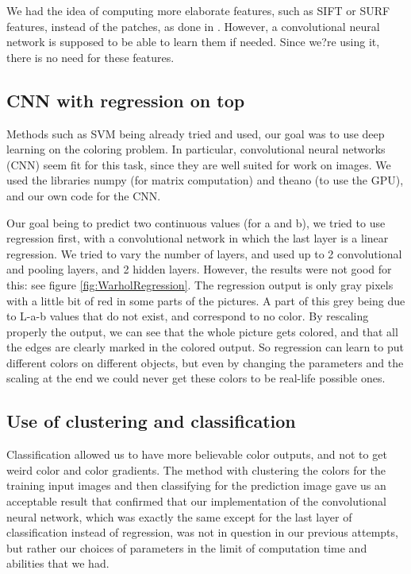 \documentclass[10pt,twocolumn]{article}
\begin{document}
We had the idea of computing more elaborate features, such as SIFT or SURF features, instead of the patches, as done in \cite{bestPaper}. However, a convolutional neural network is supposed to be able to learn them if needed. Since we?re using it, there is no need for these features.

\subsection{CNN with regression on top}
Methods such as SVM being already tried and used, our goal was to use deep learning on the coloring problem. In particular, convolutional neural networks (CNN) seem fit for this task, since they are well suited for work on images. We used the libraries numpy \cite{numpy} (for matrix computation) and theano \cite{theano} (to use the GPU), and our own code for the CNN. 

Our goal being to predict two continuous values (for a and b), we tried to use regression first, with a convolutional network in which the last layer is a linear regression. We tried to vary the number of layers, and used up to 2 convolutional and pooling layers, and 2 hidden layers. However, the results were not good for this: see figure \ref{fig:WarholRegression}. The regression output is only gray pixels with a little bit of red in some parts of the pictures. A part of this grey being due to L-a-b values that do not exist, and correspond to no color. By rescaling properly the output, we can see that the whole picture gets colored, and that all the edges are clearly marked in the colored output. So regression can learn to put different colors on different objects, but even by changing the parameters and the scaling at the end we could never get these colors to be real-life possible ones.


\subsection{Use of clustering and classification}
Classification allowed us to have more believable color outputs, and not to get weird color and color gradients. The method with clustering the colors for the training input images and then classifying for the prediction image gave us an acceptable result that confirmed that our implementation of the convolutional neural network, which was exactly the same except for the last layer of classification instead of regression, was not in question in our previous attempts, but rather our choices of parameters in the limit of computation time and abilities that we had.
\end{document}
